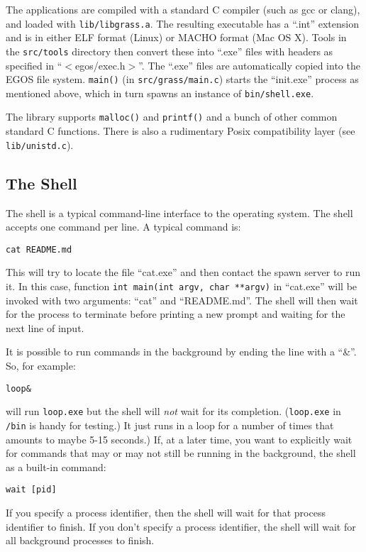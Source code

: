 \documentclass{article}
\begin{document}
The applications are compiled with a standard C compiler (such as gcc or
clang), and loaded with \texttt{lib/libgrass.a}.
The resulting executable has a ``.int'' extension and
is in either ELF format (Linux) or MACHO format (Mac OS X).  Tools in the
\texttt{src/tools} directory then convert these into ``.exe'' files with headers
as specified in ``$<$egos/exec.h$>$''.
The ``.exe'' files are automatically copied into the EGOS file system.
\texttt{main()} (in \texttt{src/grass/main.c}) starts the ``init.exe''
process as mentioned above,
which in turn spawns an instance of \texttt{bin/shell.exe}.

The library supports \texttt{malloc()} and \texttt{printf()} and a
bunch of other common standard C functions.
There is also a rudimentary Posix compatibility layer
(see \texttt{lib/unistd.c}).

\subsection{The Shell}

The shell is a typical command-line interface to the operating system.
The shell accepts one command per line.  A typical command is:
\begin{verbatim}
cat README.md
\end{verbatim}

This will try to locate the file ``cat.exe'' and then contact the
spawn server to run it.  In this case,
function \texttt{int main(int argv, char **argv)}
in ``cat.exe'' will be invoked with two arguments: ``cat'' and ``README.md''.
The shell will then wait for the process to terminate before printing a
new prompt and waiting for the next line of input.

It is possible to run commands in the background by ending the line with
a ``\&''.  So, for example:
\begin{verbatim}
loop&
\end{verbatim}
will run \texttt{loop.exe} but the shell will \emph{not} wait for its
completion.
(\texttt{loop.exe} in \texttt{/bin} is handy for testing.)
It just runs in a loop
for a number of times that amounts to maybe 5-15 seconds.)
If, at a later time, you want to explicitly wait for
commands that may or may not still be running in the background,
the shell as a built-in command:
\begin{verbatim}
wait [pid]
\end{verbatim}
If you specify a process identifier, then the shell will wait for
that process identifier to finish.  If you don't specify a process
identifier, the shell will wait for all background processes to finish.
\end{document}
